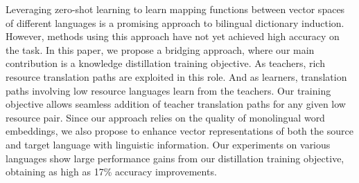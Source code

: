 Leveraging zero-shot learning to learn mapping functions between vector spaces of different languages is a promising approach to bilingual dictionary induction. However, methods using this approach have not yet achieved high accuracy on the task. In this paper, we propose a bridging approach, where our main contribution is a knowledge distillation training objective. As teachers, rich resource translation paths are exploited in this role. And as learners, translation paths involving low resource languages learn from the teachers. Our training objective allows seamless addition of teacher translation paths for any given low resource pair. Since our approach relies on the quality of monolingual word embeddings, we also propose to enhance vector representations of both the source and target language with linguistic information. Our experiments on various languages show large performance gains from our distillation training objective, obtaining as high as 17\% accuracy improvements.
